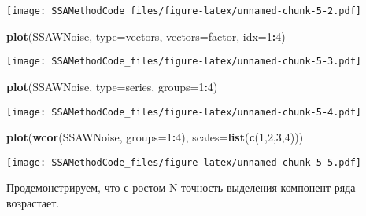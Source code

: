 \documentclass[
]{article}
\newenvironment{Shaded}{\begin{snugshade}}{\end{snugshade}}
\newcommand{\AttributeTok}[1]{\textcolor[rgb]{0.13,0.29,0.53}{#1}}
\newcommand{\DecValTok}[1]{\textcolor[rgb]{0.00,0.00,0.81}{#1}}
\newcommand{\FunctionTok}[1]{\textcolor[rgb]{0.13,0.29,0.53}{\textbf{#1}}}
\newcommand{\NormalTok}[1]{#1}
\newcommand{\SpecialCharTok}[1]{\textcolor[rgb]{0.81,0.36,0.00}{\textbf{#1}}}
\newcommand{\StringTok}[1]{\textcolor[rgb]{0.31,0.60,0.02}{#1}}
\begin{document}
\texttt{[image: SSAMethodCode\_files/figure-latex/unnamed-chunk-5-2.pdf]}

\begin{Shaded}
\begin{Highlighting}[]
\FunctionTok{plot}\NormalTok{(SSAWNoise, }\AttributeTok{type=}\StringTok{\textquotesingle{}vectors\textquotesingle{}}\NormalTok{, }\AttributeTok{vectors=}\StringTok{\textquotesingle{}factor\textquotesingle{}}\NormalTok{, }\AttributeTok{idx=}\DecValTok{1}\SpecialCharTok{:}\DecValTok{4}\NormalTok{)}
\end{Highlighting}
\end{Shaded}

\texttt{[image: SSAMethodCode\_files/figure-latex/unnamed-chunk-5-3.pdf]}

\begin{Shaded}
\begin{Highlighting}[]
\FunctionTok{plot}\NormalTok{(SSAWNoise, }\AttributeTok{type=}\StringTok{\textquotesingle{}series\textquotesingle{}}\NormalTok{, }\AttributeTok{groups=}\DecValTok{1}\SpecialCharTok{:}\DecValTok{4}\NormalTok{)}
\end{Highlighting}
\end{Shaded}

\texttt{[image: SSAMethodCode\_files/figure-latex/unnamed-chunk-5-4.pdf]}

\begin{Shaded}
\begin{Highlighting}[]
\FunctionTok{plot}\NormalTok{(}\FunctionTok{wcor}\NormalTok{(SSAWNoise, }\AttributeTok{groups=}\DecValTok{1}\SpecialCharTok{:}\DecValTok{4}\NormalTok{), }\AttributeTok{scales=}\FunctionTok{list}\NormalTok{(}\FunctionTok{c}\NormalTok{(}\DecValTok{1}\NormalTok{,}\DecValTok{2}\NormalTok{,}\DecValTok{3}\NormalTok{,}\DecValTok{4}\NormalTok{)))}
\end{Highlighting}
\end{Shaded}

\texttt{[image: SSAMethodCode\_files/figure-latex/unnamed-chunk-5-5.pdf]}

Продемонстрируем, что с ростом N точность выделения компонент ряда
возрастает.
\end{document}
